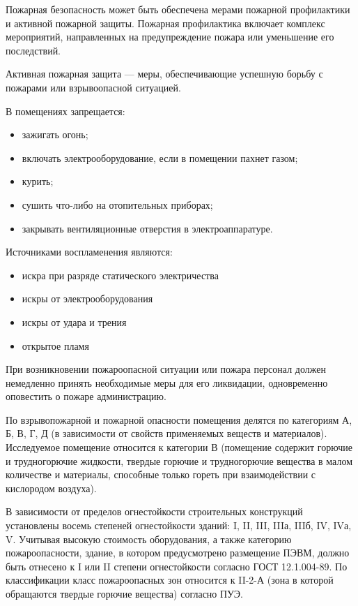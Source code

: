 Пожарная безопасность может быть обеспечена мерами пожарной профилактики и активной пожарной защиты.
Пожарная профилактика включает комплекс мероприятий, направленных на предупреждение пожара или уменьшение его последствий.

Активная пожарная защита --- меры, обеспечивающие успешную борьбу с пожарами или взрывоопасной ситуацией.

В помещениях запрещается:
\begin{itemize}
  \item зажигать огонь;
  \item включать электрооборудование, если в помещении пахнет газом;
  \item курить;
  \item сушить что-либо на отопительных приборах;
  \item закрывать вентиляционные отверстия в электроаппаратуре.
\end{itemize}

Источниками воспламенения являются:
\begin{itemize}
  \item искра при разряде статического электричества
  \item искры от электрооборудования
  \item искры от удара и трения
  \item открытое пламя
\end{itemize}

При возникновении пожароопасной ситуации или пожара персонал должен немедленно принять необходимые меры для его ликвидации, одновременно оповестить о пожаре администрацию.

По взрывопожарной и пожарной опасности помещения делятся по категориям А, Б, В, Г, Д (в зависимости от свойств применяемых веществ и материалов). Исследуемое  помещение относится к категории В (помещение содержит горючие и трудногорючие жидкости, твердые горючие и трудногорючие вещества в малом количестве и материалы, способные только гореть при взаимодействии с кислородом воздуха).

В зависимости от пределов огнестойкости строительных конструкций установлены восемь степеней огнестойкости зданий: I, II, III, IIIа, IIIб, IV, IVа, V. Учитывая высокую стоимость оборудования, а также категорию пожароопасности, здание, в котором предусмотрено размещение ПЭВМ, должно быть отнесено к I или II степени огнестойкости согласно ГОСТ 12.1.004-89. По классификации класс пожароопасных зон относится к II-2-А (зона в которой обращаются твердые горючие вещества) согласно ПУЭ.

